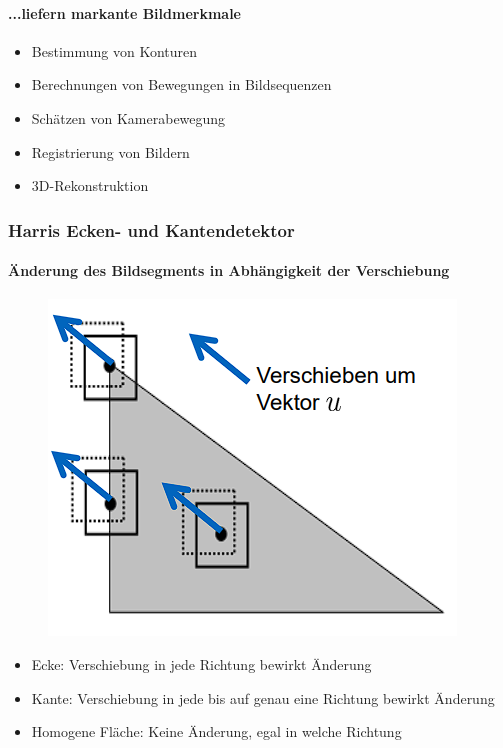 \documentclass[12pt, a4paper, oneside]{article}
\begin{document}
\paragraph*{...liefern markante Bildmerkmale}
\begin{itemize}
    \item Bestimmung von Konturen
    \item Berechnungen von Bewegungen in Bildsequenzen
    \item Schätzen von Kamerabewegung
    \item Registrierung von Bildern
    \item 3D-Rekonstruktion
\end{itemize}

\subsubsection{Harris Ecken- und Kantendetektor}
\paragraph*{Änderung des Bildsegments in Abhängigkeit der Verschiebung}
\begin{figure}[htbp]
    \centering
    \includegraphics[scale=1]{../img/1-13.png}
    \label{img/1-13}
\end{figure}
\begin{itemize}
    \item Ecke: Verschiebung in jede Richtung bewirkt Änderung
    \item Kante: Verschiebung in jede bis auf genau eine Richtung bewirkt Änderung
    \item Homogene Fläche: Keine Änderung, egal in welche Richtung
\end{itemize}
\end{document}
